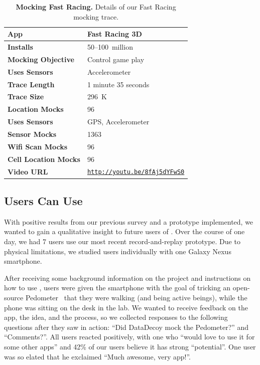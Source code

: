 \begin{table}[t]

\begin{tabularx}{3.33in}{lX}
\textbf{App} & Fast Racing 3D \\ \toprule
\textbf{Installs} & 50--100~million \\
  \textbf{Mocking Objective} & Control game play \\ \midrule
\textbf{Uses Sensors} & Accelerometer \\
\textbf{Trace Length} & 1 minute 35 seconds \\
\textbf{Trace Size} & 296~K \\
\textbf{Location Mocks} & 96 \\
\textbf{Uses Sensors} & GPS, Accelerometer \\
\textbf{Sensor Mocks} & 1363 \\
\textbf{Wifi Scan Mocks} & 96 \\
\textbf{Cell Location Mocks} & 96 \\
\textbf{Video URL} &
  \hyperlink{http://youtu.be/8fAj5dYFwS0}{\texttt{http://youtu.be/8fAj5dYFwS0}}
  \\

\end{tabularx}

\caption{\textbf{Mocking Fast Racing.} Details of our Fast Racing
  mocking trace.}

\label{table-mocking-game}
\vspace*{-0.2in}
\end{table}

\subsection{Users Can Use \PocketMocker{}}
\label{subsec-usability}


With positive results from our previous survey and a prototype implemented, we 
wanted to gain a qualitative insight to future users of \PocketMocker{}. Over 
the course of one day, we had 7 users use our most recent record-and-replay 
prototype. Due to physical limitations, we studied users individually with one 
Galaxy Nexus smartphone. 

After receiving some background information on the project and instructions
on how to use \PocketMocker{}, users were given the smartphone with the goal
of tricking an open-source Pedometer~\cite{pedometer-playstore-url} that they
were walking (and being active beings), while the phone was sitting on the
desk in the lab. We wanted to receive feedback on the app, the idea,
and the process, so we collected responses to the following questions after
they saw \PocketMocker{} in action: ``Did DataDecoy mock the Pedometer?'' and
``Comments?''. All users reacted positively, with one who ``would love to use
it for some other apps'' and 42\% of our users believe it has strong
``potential''. One user was so elated that he exclaimed ``Much awesome, very
app!''.

